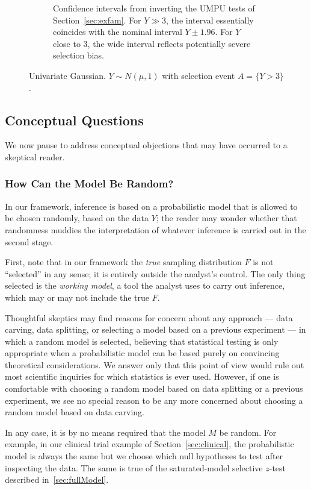 \documentclass{article}
\theoremstyle{definition}
\newcommand{\sampOrData}{data }
\begin{document}
\begin{figure}
\begin{subfigure}[t]{0.4\textwidth}
    \caption{Confidence intervals from inverting the UMPU tests of Section~\ref{sec:exfam}. For $Y\gg 3$, the interval essentially coincides with the nominal interval ${Y \pm 1.96}$. For $Y$ close to 3, the wide interval reflects potentially severe selection bias.}
    \label{fig:umpuUnivar}
  \end{subfigure}
  \caption{Univariate Gaussian. $Y\sim N(\mu, 1)$ with selection event $A=\{Y>3\}$.}
\label{fig:univar}
\end{figure}

\subsection{Conceptual Questions}\label{sec:conceptual}

We now pause to address conceptual objections that may have occurred to a skeptical reader.

\subsubsection{How Can the Model Be Random?}\label{sec:howRandom}

In our framework, inference is based on a probabilistic model that is allowed to be chosen randomly, based on the data $Y$; the reader may wonder whether that randomness muddies the interpretation of whatever inference is carried out in the second stage.

First, note that in our framework the {\em true} sampling distribution $F$ is not ``selected'' in any sense; it is entirely outside the analyst's control. The only thing selected is the {\em working model}, a tool the analyst uses to carry out inference, which may or may not include the true $F$.

Thoughtful skeptics may find reasons for concern about any approach --- \sampOrData carving, \sampOrData splitting, or selecting a model based on a previous experiment --- in which a random model is selected, believing that statistical testing is only appropriate when a probabilistic model can be based purely on convincing theoretical considerations. We answer only that this point of view would rule out most scientific inquiries for which statistics is ever used. However, if one is comfortable with choosing a random model based on \sampOrData splitting or a previous experiment, we see no special reason to be any more concerned about choosing a random model based on \sampOrData carving.

In any case, it is by no means required that the model $M$ be random. For example, in our clinical trial example of Section~\ref{sec:clinical}, the probabilistic model is always the same but we choose which null hypotheses to test after inspecting the data. The same is true of the saturated-model selective $z$-test described in~\ref{sec:fullModel}.
\end{document}
